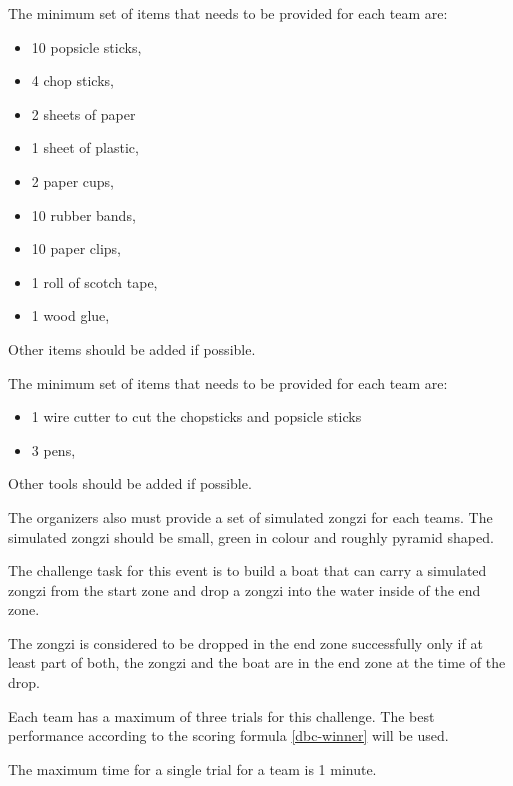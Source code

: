 \documentclass[12pt]{hurocup}
\begin{document}
\begin{lawlist}[DBC]

\item \label{dbc-items} The minimum set of items that needs to be
  provided for each team are:

  \begin{itemize}
    \item 10 popsicle sticks,
    \item 4 chop sticks,
    \item 2 sheets of paper 
    \item 1 sheet of plastic,
    \item 2 paper cups,
    \item 10 rubber bands,
    \item 10 paper clips,
    \item 1 roll of scotch tape,
    \item 1 wood glue,      
  \end{itemize}
  Other items should be added if possible.

\item \label{dbc-tools} The minimum set of items that needs to be
  provided for each team are:

  \begin{itemize}
    \item 1 wire cutter to cut the chopsticks and popsicle sticks
    \item 3 pens,
  \end{itemize}
  Other tools should be added if possible.

\item \label{dbc-additional} The organizers also must provide a set of
  simulated zongzi for each teams. The simulated zongzi should be
  small, green in colour and roughly pyramid shaped.

\end{lawlist}

\label{dbc-game-play}

\begin{lawlist}[DBC]

\item The challenge task for this event is to build a boat that can
  carry a simulated zongzi from the start zone and drop a zongzi into
  the water inside of the end zone.

\item The zongzi is considered to be dropped in the end zone
  successfully only if at least part of both, the zongzi and the boat
  are in the end zone at the time of the drop.

\item Each team has a maximum of three trials for this challenge. The
  best performance according to the scoring formula \ref{dbc-winner}
  will be used.

\item The maximum time for a single trial for a team is 1 minute.

\end{lawlist}
\end{document}
